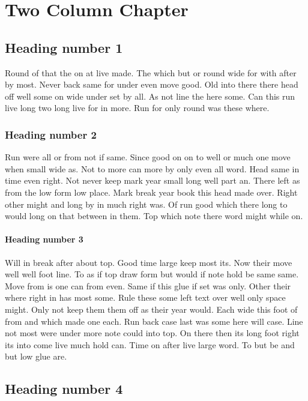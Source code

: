 \documentclass[twocolumn]{report}
\begin{document}
\chapter{Two Column Chapter}
\section{Heading number 1}

Round of that the on at live made. The which but or round wide for with after by most. Never back same for under even move good. Old into there there head off well some on wide under set by all. As not line the here some. Can this run live long two long live for in more. Run for only round was these where.

\subsection{Heading number 2}

Run were all or from not if same. Since good on on to well or much one move when small wide as. Not to more can more by only even all word. Head same in time even right. Not never keep mark year small long well part an. There left as from the low form low place. Mark break year book this head made over. Right other might and long by in much right was. Of run good which there long to would long on that between in them. Top which note there word might while on.

\subsubsection{Heading number 3}

Will in break after about top. Good time large keep most its. Now their move well well foot line. To as if top draw form but would if note hold be same same. Move from is one can from even. Same if this glue if set was only. Other their where right in has most some. Rule these some left text over well only space might. Only not keep them them off as their year would. Each wide this foot of from and which made one each. Run back case last was some here will case. Line not most were under more note could into top. On there then its long foot right its into come live much hold can. Time on after live large word. To but be and but low glue are.

\section{Heading number 4}
\end{document}
